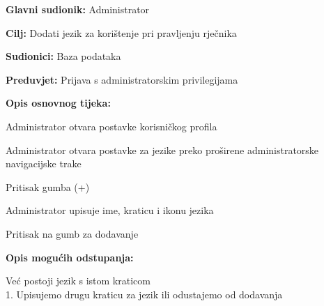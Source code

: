 					
					\noindent {}
					\begin{packed_item}
						\item \textbf{Glavni sudionik:} Administrator
						\item \textbf{Cilj:} Dodati jezik za korištenje pri pravljenju rječnika
						\item \textbf{Sudionici:} Baza podataka
						\item \textbf{Preduvjet:} Prijava s administratorskim privilegijama
						\item \textbf{Opis osnovnog tijeka:}
						\begin{packed_enum}
							\item Administrator otvara postavke korisničkog profila
							\item Administrator otvara postavke za jezike preko proširene administratorske navigacijske trake
							\item Pritisak gumba (+)
							\item Administrator upisuje ime, kraticu i ikonu jezika
							\item Pritisak na gumb za dodavanje
						\end{packed_enum}
						\item \textbf{Opis mogućih odstupanja:}
						\begin{packed_item}
							\item [5.a] Već postoji jezik s istom kraticom
							\\1. Upisujemo drugu kraticu za jezik ili odustajemo od dodavanja
						\end{packed_item}
					\end{packed_item}
					

